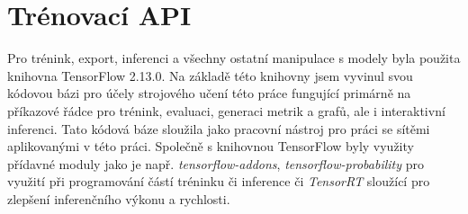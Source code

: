 \section{Trénovací API}
\label{sec:Chapter52}
Pro trénink, export, inferenci a všechny ostatní manipulace s modely byla použita knihovna TensorFlow 2.13.0. Na základě této knihovny jsem vyvinul svou kódovou bázi pro účely strojového učení této práce fungující primárně na příkazové řádce pro trénink, evaluaci, generaci metrik a grafů, ale i interaktivní inferenci. Tato kódová báze sloužila jako pracovní nástroj pro práci se sítěmi aplikovanými v této práci. Společně s knihovnou TensorFlow byly využity přídavné moduly jako je např. \textit{tensorflow-addons}, \textit{tensorflow-probability} \cite{tensorflow_libs} pro využití při programování částí tréninku či inference či \textit{TensorRT} \cite{tensorrt_docs} sloužící pro zlepšení inferenčního výkonu a rychlosti.
\endinput